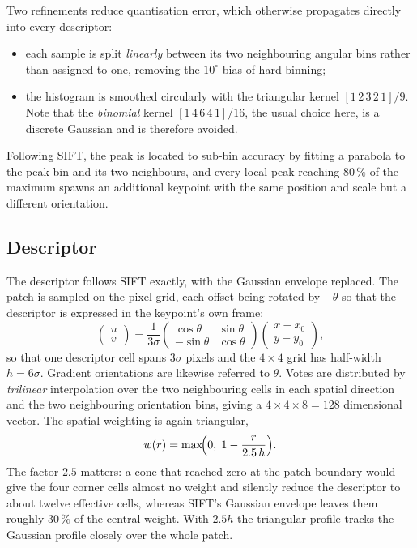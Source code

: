 \documentclass[11pt,a4paper]{article}
\begin{document}
Two refinements reduce quantisation error, which otherwise propagates directly
into every descriptor:
\begin{itemize}\itemsep2pt
\item each sample is split \emph{linearly} between its two neighbouring
angular bins rather than assigned to one, removing the $10^{\circ}$ bias of
hard binning;
\item the histogram is smoothed circularly with the triangular kernel
$[1\,2\,3\,2\,1]/9$. Note that the \emph{binomial} kernel $[1\,4\,6\,4\,1]/16$,
the usual choice here, is a discrete Gaussian and is therefore avoided.
\end{itemize}
Following SIFT, the peak is located to sub-bin accuracy by fitting a parabola
to the peak bin and its two neighbours, and every local peak reaching $80\,\%$
of the maximum spawns an additional keypoint with the same position and scale
but a different orientation.

\subsection{Descriptor}

The descriptor follows SIFT exactly, with the Gaussian envelope replaced. The
patch is sampled on the pixel grid, each offset being rotated by $-\theta$ so
that the descriptor is expressed in the keypoint's own frame:
\begin{equation}
\begin{pmatrix}u\\v\end{pmatrix}
=\frac{1}{3\sigma}
\begin{pmatrix}\cos\theta & \sin\theta\\ -\sin\theta & \cos\theta\end{pmatrix}
\begin{pmatrix}x-x_0\\ y-y_0\end{pmatrix},
\end{equation}
so that one descriptor cell spans $3\sigma$ pixels and the $4\times4$ grid has
half-width $h=6\sigma$. Gradient orientations are likewise referred to
$\theta$. Votes are distributed by \emph{trilinear} interpolation over the two
neighbouring cells in each spatial direction and the two neighbouring
orientation bins, giving a $4\times4\times8=128$ dimensional vector. The
spatial weighting is again triangular,
\begin{equation}
w(r)=\max\!\Bigl(0,\;1-\frac{r}{2.5\,h}\Bigr).
\end{equation}
The factor $2.5$ matters: a cone that reached zero at the patch boundary would
give the four corner cells almost no weight and silently reduce the descriptor
to about twelve effective cells, whereas SIFT's Gaussian envelope leaves them
roughly $30\,\%$ of the central weight. With $2.5h$ the triangular profile
tracks the Gaussian profile closely over the whole patch.
\end{document}
